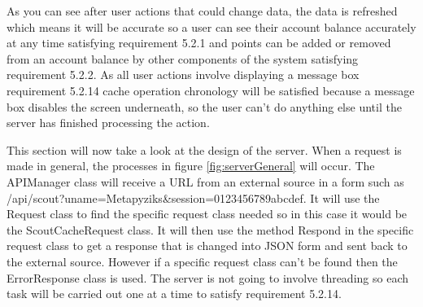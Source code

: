 As you can see after user actions that could change data, the data is refreshed which means it will be accurate so a user can see their account balance accurately at any time satisfying requirement 5.2.1 and points can be added or removed from an account balance by other components of the system satisfying requirement 5.2.2. As all user actions involve displaying a message box requirement 5.2.14 cache operation chronology will be satisfied because a message box disables the screen underneath, so the user can't do anything else until the server has finished processing the action.

This section will now take a look at the design of the server. When a request is made in general, the processes in figure \ref{fig:serverGeneral} will occur. The APIManager class will receive a URL from an external source in a form such as /api/scout?uname=Metapyziks\&session=0123456789abcdef. It will use the Request class to find the specific request class needed so in this case it would be the ScoutCacheRequest class. It will then use the method Respond in the specific request class to get a response that is changed into JSON form and sent back to the external source. However if a specific request class can't be found then the ErrorResponse class is used. The server is not going to involve threading so each task will be carried out one at a time to satisfy requirement 5.2.14.

